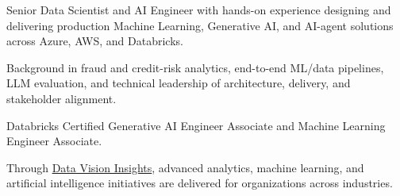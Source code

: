 
{\small\color{cvtext}%
\noindent Senior Data Scientist and AI Engineer with hands-on experience designing and delivering production Machine Learning, Generative AI, and AI-agent solutions across Azure, AWS, and Databricks.\par
\vspace{0.14em}%
\noindent Background in fraud and credit-risk analytics, end-to-end ML/data pipelines, LLM evaluation, and technical leadership of architecture, delivery, and stakeholder alignment.\par
\vspace{0.14em}%
\noindent Databricks Certified Generative AI Engineer Associate and Machine Learning Engineer Associate.\par
\vspace{0.14em}%
\noindent Through \href{https://datavisioninsights.com/}{Data Vision Insights}, advanced analytics, machine learning, and artificial intelligence initiatives are delivered for organizations across industries.\par
}
